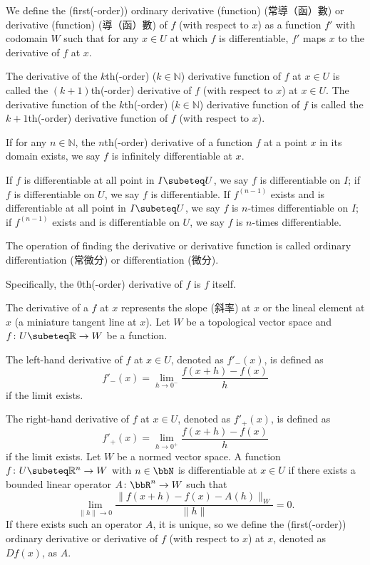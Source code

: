 \documentclass[a4paper,12pt]{report}
\begin{document}
\begin{itemize}
\begin{itemize}
We define the (first(-order)) ordinary derivative (function) (常導（函）數) or derivative (function) (導（函）數) of $f$ (with respect to $x$) as a function $f'$ with codomain $W$ such that for any $x\in U$ at which $f$ is differentiable, $f'$ maps $x$ to the derivative of $f$ at $x$.

The derivative of the $k$th(-order) ($k\in\mathbb{N}$) derivative function of $f$ at $x\in U$ is called the $(k+1)$th(-order) derivative of $f$ (with respect to $x$) at $x\in U$. The derivative function of the $k$th(-order) ($k\in\mathbb{N}$) derivative function of $f$ is called the $k+1$th(-order) derivative function of $f$ (with respect to $x$).

If for any $n\in\mathbb{N}$, the $n$th(-order) derivative of a function $f$ at a point $x$ in its domain exists, we say $f$ is infinitely differentiable at $x$.

If $f$ is differentiable at all point in $I\subeteq U$, we say $f$ is differentiable on $I$; if $f$ is differentiable on $U$, we say $f$ is differentiable. If $f^{(n-1)}$ exists and is differentiable at all point in $I\subeteq U$, we say $f$ is $n$-times differentiable on $I$; if $f^{(n-1)}$ exists and is differentiable on $U$, we say $f$ is $n$-times differentiable.

The operation of finding the derivative or derivative function is called ordinary differentiation (常微分) or differentiation (微分).

Specifically, the $0$th(-order) derivative of $f$ is $f$ itself.

The derivative of a $f$ at $x$ represents the slope (斜率) at $x$ or the lineal element at $x$ (a miniature tangent line at $x$).
Let $W$ be a topological vector space and $f\colon U\subeteq\mathbb{R}\to W$ be a function.

The left-hand derivative of $f$ at $x\in U$, denoted as $f'_-(x)$, is defined as
\[f'_-(x)=\lim_{h\to 0^-}\frac{f(x+h)-f(x)}{h}\]
if the limit exists.

The right-hand derivative of $f$ at $x\in U$, denoted as $f'_+(x)$, is defined as
\[f'_+(x)=\lim_{h\to 0^+}\frac{f(x+h)-f(x)}{h}\]
if the limit exists.
Let $W$ be a normed vector space. A function $f\colon U\subeteq\mathbb{R}^n\to W$ with $n\in\bbN$ is differentiable at $x\in U$ if there exists a bounded linear operator $A\colon\bbR^n\to W$ such that
\[\lim_{\|h\|\to 0}\frac{\|f(x+h)-f(x)-A(h)\|_W}{\|h\|}=0.\]
If there exists such an operator $A$, it is unique, so we define the (first(-order)) ordinary derivative or derivative of $f$ (with respect to $x$) at $x$, denoted as $Df(x)$, as $A$.


\end{itemize}
\end{itemize}
\end{document}
